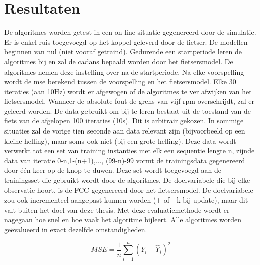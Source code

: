 \chapter{Resultaten}
De algoritmes worden getest in een on-line situatie gegenereerd door de simulatie. Er is enkel ruis toegevoegd op het koppel geleverd door de fietser. De modellen beginnen van nul (niet vooraf getraind). Gedurende een startperiode leren de algoritmes bij en zal de cadans bepaald worden door het fietsersmodel. De algoritmes nemen deze instelling over na de startperiode. Na elke voorspelling wordt de \gls{mse} berekend tussen de voorspelling en het fietsersmodel. Elke 30 iteraties (aan 10Hz) wordt er afgewogen of de algoritmes te ver afwijken van het fietsersmodel. Wanneer de absolute fout de grens van vijf rpm overschrijdt, zal er geleerd worden. De data gebruikt om bij te leren bestaat uit de toestand van de fiets van de afgelopen 100 iteraties (10s). Dit is arbitrair gekozen. In sommige situaties zal de vorige tien seconde aan data relevant zijn (bijvoorbeeld op een kleine helling), maar soms ook niet (bij een grote helling). Deze data wordt verwerkt tot een set van training instanties met elk een sequentie lengte n, zijnde data van iteratie 0-n,1-(n+1),..., (99-n)-99 vormt de trainingsdata gegenereerd door één keer op de knop te duwen. Deze set wordt toegevoegd aan de trainingsset die gebruikt wordt door de algoritmes. De doelvariabele die bij elke observatie hoort, is de FCC gegenereerd door het fietsersmodel. De doelvariabele zou ook incrementeel aangepast kunnen worden (+ of - k bij update), maar dit valt buiten het doel van deze thesis. Met deze evaluatiemethode wordt er nagegaan hoe snel en hoe vaak het algoritme bijleert. Alle algoritmes worden geëvalueerd in exact dezelfde omstandigheden.

\[MSE = \frac{1}{n} \sum_{i=1}^{n} (Y_i-\hat{Y}_i)^2\]

